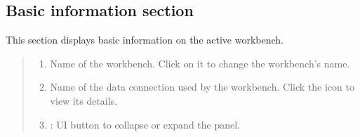 \documentclass[letterpaper,10pt,english]{sphinxmanual}
\begin{document}
\subsection{Basic information section}
\label{\detokenize{discovery/part06/06_03-use_a_workbench:workbench-use-1}}\label{\detokenize{discovery/part06/06_03-use_a_workbench:id2}}
This section displays basic information on the active workbench.
\begin{quote}

\begin{figure}[H]
\centering

\noindent{}
\end{figure}
\begin{enumerate}
\def\theenumi{\arabic{enumi}}
\def\labelenumi{\theenumi .}
\makeatletter\def\p@enumii{\p@enumi \theenumi .}\makeatother
\item {} 
 Name of the workbench. Click on it to change the workbench’s name.

\item {} 
 Name of the data connection used by the workbench. Click the  icon to view its details.

\item {} 
 : UI button to collapse or expand the panel.

\end{enumerate}
\end{quote}
\end{document}
